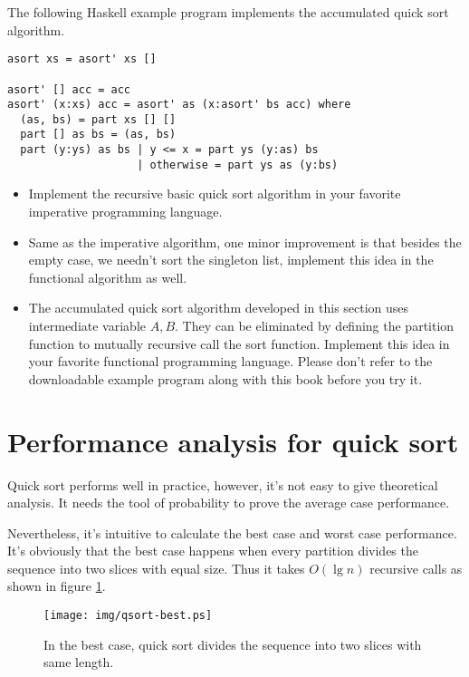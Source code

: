 \documentclass[UTF8]{article}
\begin{document}
The following Haskell example program implements the accumulated quick sort algorithm.

\lstset{language=Haskell}
\begin{lstlisting}
asort xs = asort' xs []

asort' [] acc = acc
asort' (x:xs) acc = asort' as (x:asort' bs acc) where
  (as, bs) = part xs [] []
  part [] as bs = (as, bs)
  part (y:ys) as bs | y <= x = part ys (y:as) bs
                    | otherwise = part ys as (y:bs)
\end{lstlisting}

\begin{Exercise}
\begin{itemize}
\item Implement the recursive basic quick sort algorithm in your favorite imperative programming language.
\item Same as the imperative algorithm, one minor improvement is that besides the empty case, we needn't sort the singleton list, implement
this idea in the functional algorithm as well.
\item The accumulated quick sort algorithm developed in this section uses intermediate variable $A, B$. They
can be eliminated by defining the partition function to mutually recursive call the sort function. Implement this
idea in your favorite functional programming language. Please don't refer to the downloadable example program
along with this book before you try it.
\end{itemize}
\end{Exercise}

\section{Performance analysis for quick sort}

Quick sort performs well in practice, however, it's not easy to give theoretical analysis. It needs the tool
of probability to prove the average case performance.

Nevertheless, it's intuitive to calculate the best case and worst case performance. It's obviously that
the best case happens when every partition divides the sequence into two slices with equal size. Thus
it takes $O(\lg n)$ recursive calls as shown in figure \ref{fig:qsort-best}.

\begin{figure}[htbp]
 \centering
 \texttt{[image: img/qsort-best.ps]}
 \caption{In the best case, quick sort divides the sequence into two slices with same length.}
 \label{fig:qsort-best}
\end{figure}
\end{document}
